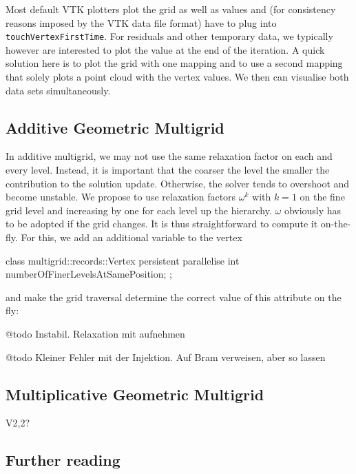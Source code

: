 \begin{remark}
  Most default VTK plotters plot the grid as well as values and (for
  consistency reasons imposed by the VTK data file format) have to plug into
  \texttt{touchVertexFirstTime}. For residuals and other temporary data, we
  typically however are interested to plot the value at the end of the
  iteration. A quick solution here is to plot the grid with one mapping and to
  use a second mapping that solely plots a point cloud with the vertex values.
  We then can visualise both data sets simultaneously.
\end{remark}

\subsection{Additive Geometric Multigrid}

In additive multigrid, we may not use the same relaxation factor on each and
every level. 
Instead, it is important that the coarser the level the smaller the contribution
to the solution update.
Otherwise, the solver tends to overshoot and become unstable. 
We propose to use relaxation factors $\omega ^k$ with $k=1$ on the fine grid
level and increasing by one for each level up the hierarchy.
$\omega $ obviously has to be adopted if the grid changes.
It is thus straightforward to compute it on-the-fly. 
For this, we add an additional variable to the vertex

\begin{code}
class multigrid::records::Vertex {  
  persistent parallelise int  numberOfFinerLevelsAtSamePosition;
};
\end{code}

\noindent
and make the grid traversal determine the correct value of this attribute
on the fly:



@todo Instabil. Relaxation mit aufnehmen

@todo Kleiner Fehler mit der Injektion. Auf Bram verweisen, aber so lassen







\subsection{Multiplicative Geometric Multigrid}

V2,2?




\subsection*{Further reading}

